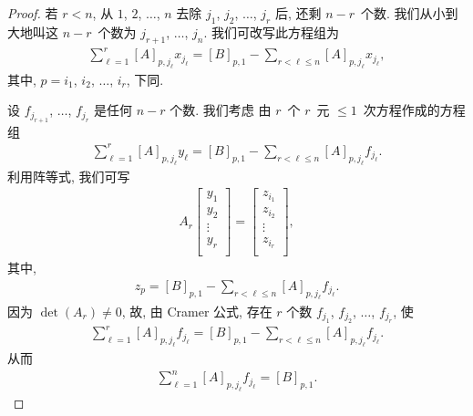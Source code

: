 \documentclass[../libro.tex]{subfiles}
\begin{document}
\begin{proof}
    若 \(r < n\),
    从 \(1\), \(2\), \(\dots\), \(n\)
    去除 \(j_1\), \(j_2\), \(\dots\), \(j_r\)
    后, 还剩 \(n - r\)~个数.
    我们从小到大地叫这 \(n - r\)~个数为
    \(j_{r+1}\), \(\dots\), \(j_n\).
    我们可改写此方程组为
    \begin{align*}
        \sum_{\ell = 1}^{r}
        {[A]_{p,j_\ell} x_{j_\ell}}
        = [B]_{p,1}
        - \sum_{r < \ell \leq n}
        {[A]_{p,j_\ell} x_{j_\ell}},
    \end{align*}
    其中, \(p = i_1\), \(i_2\), \(\dots\), \(i_r\),
    下同.

    设
    \(f_{j_{r+1}}\), \(\dots\), \(f_{j_r}\)
    是任何 \(n-r\) 个数.
    我们考虑%
    由 \(r\)~个 \(r\)~元 \({\leq} 1\)~次方程作成的方程组
    \begin{align*}
        \sum_{\ell = 1}^{r}
        {[A]_{p,j_\ell} y_\ell}
        = [B]_{p,1}
        - \sum_{r < \ell \leq n}
        {[A]_{p,j_\ell} f_{j_\ell}}.
    \end{align*}
    利用阵等式, 我们可写
    \begin{align*}
        A_r
        \begin{bmatrix}
            y_1    \\
            y_2    \\
            \vdots \\
            y_r    \\
        \end{bmatrix}
        =
        \begin{bmatrix}
            z_{i_1} \\
            z_{i_2} \\
            \vdots  \\
            z_{i_r} \\
        \end{bmatrix},
    \end{align*}
    其中,
    \begin{align*}
        z_p = [B]_{p,1}
        - \sum_{r < \ell \leq n}
        {[A]_{p,j_\ell} f_{j_\ell}}.
    \end{align*}
    因为 \(\det {(A_r)} \neq 0\),
    故, 由 Cramer 公式,
    存在 \(r\) 个数
    \(f_{j_1}\), \(f_{j_2}\), \(\dots\), \(f_{j_r}\),
    使
    \begin{align*}
        \sum_{\ell = 1}^{r}
        {[A]_{p,j_\ell} f_{j_\ell}}
        = [B]_{p,1}
        - \sum_{r < \ell \leq n}
        {[A]_{p,j_\ell} f_{j_\ell}}.
    \end{align*}
    从而
    \begin{align*}
        \sum_{\ell = 1}^{n}
        {[A]_{p,j_\ell} f_{j_\ell}}
        = [B]_{p,1}.
    \end{align*}


\end{proof}
\end{document}

